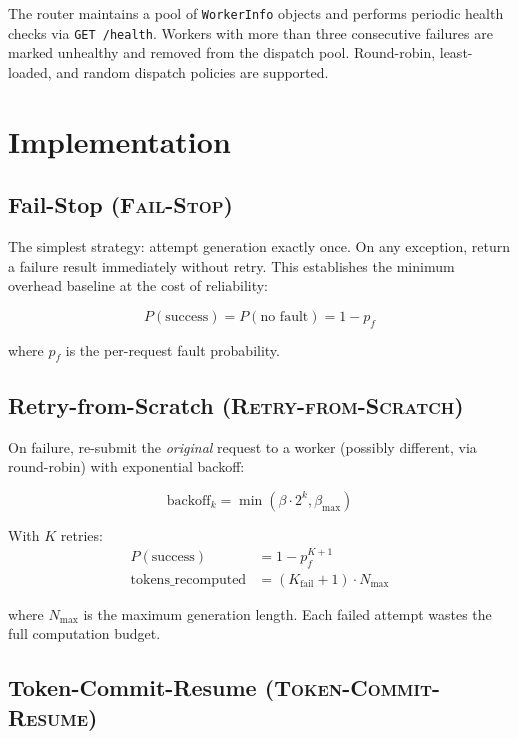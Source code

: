 \documentclass[10pt,twocolumn]{article}
\newcommand{\failstop}{\textsc{Fail-Stop}}
\newcommand{\retry}{\textsc{Retry-from-Scratch}}
\newcommand{\tcr}{\textsc{Token-Commit-Resume}}
\begin{document}
The router maintains a pool of \texttt{WorkerInfo} objects and performs
periodic health checks via \texttt{GET /health}. Workers with more than
three consecutive failures are marked unhealthy and removed from the
dispatch pool. Round-robin, least-loaded, and random dispatch policies
are supported.

\section{Implementation}
\label{sec:implementation}

\subsection{Fail-Stop (\failstop{})}

The simplest strategy: attempt generation exactly once. On any exception,
return a failure result immediately without retry. This establishes the
minimum overhead baseline at the cost of reliability:

\begin{equation}
P(\text{success}) = P(\text{no fault}) = 1 - p_f
\end{equation}

where $p_f$ is the per-request fault probability.

\subsection{Retry-from-Scratch (\retry{})}

On failure, re-submit the \textit{original} request to a worker (possibly
different, via round-robin) with exponential backoff:

\begin{equation}
\text{backoff}_k = \min(\beta \cdot 2^k, \beta_{\max})
\end{equation}

With $K$ retries:
\begin{align}
P(\text{success}) &= 1 - p_f^{K+1} \\
\text{tokens\_recomputed} &= (K_{\text{fail}} + 1) \cdot N_{\text{max}}
\end{align}

where $N_{\text{max}}$ is the maximum generation length. Each failed attempt
wastes the full computation budget.

\subsection{Token-Commit-Resume (\tcr{})}
\end{document}
